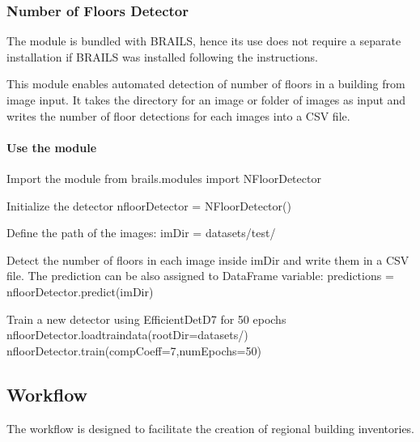 \documentclass[letterpaper,10pt,english]{sphinxmanual}
\begin{document}
\subsubsection{Number of Floors Detector}
\label{\detokenize{common/user_manual/modules/nFloorDetector:number-of-floors-detector}}\label{\detokenize{common/user_manual/modules/nFloorDetector:lbl-nfloordetector}}\label{\detokenize{common/user_manual/modules/nFloorDetector::doc}}
\sphinxAtStartPar
The module is bundled with BRAILS, hence its use does not require a separate installation if BRAILS was installed following the {\hyperref[\detokenize{common/user_manual/installation:lbl-install}]{}} instructions.

\sphinxAtStartPar
This module enables automated detection of number of floors in a building from image input. It takes the directory for an image or folder of images as input and writes the number of floor detections for each images into a CSV file.


\paragraph{Use the module}
\label{\detokenize{common/user_manual/modules/nFloorDetector:use-the-module}}
\begin{sphinxVerbatim}[commandchars=\\\{\}]
\PYGZsh{} Import the module
from brails.modules import NFloorDetector

\PYGZsh{} Initialize the detector
nfloorDetector = NFloorDetector()

\PYGZsh{} Define the path of the images:
imDir = \PYGZdq{}datasets/test/\PYGZdq{}

\PYGZsh{} Detect the number of floors in each image inside imDir and write them in a
\PYGZsh{} CSV file. The prediction can be also assigned to DataFrame variable:
predictions = nfloorDetector.predict(imDir)

\PYGZsh{} Train a new detector using EfficientDet\PYGZhy{}D7 for 50 epochs
nfloorDetector.load\PYGZus{}train\PYGZus{}data(rootDir=\PYGZdq{}datasets/\PYGZdq{})
nfloorDetector.train(compCoeff=7,numEpochs=50)
\end{sphinxVerbatim}


\subsection{Workflow}
\label{\detokenize{common/user_manual/workflow:workflow}}\label{\detokenize{common/user_manual/workflow:lbl-workflow-tutorial}}\label{\detokenize{common/user_manual/workflow::doc}}
\sphinxAtStartPar
The workflow is designed to facilitate the creation of regional building inventories.
\end{document}
